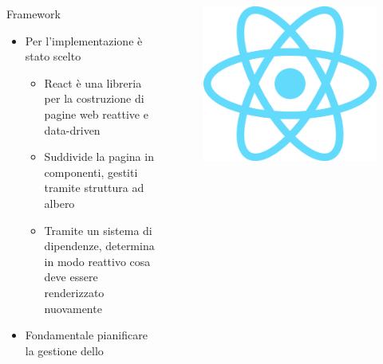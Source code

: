     \begin{frame}{\insertsectionhead}{\insertsubsectionhead}
      \begin{columns}
        \begin{column}{.8\textwidth}
          \begin{block}{Framework}
            \begin{itemize}
              \item
                Per l'implementazione è stato scelto 
                \begin{itemize}
                  \item React è una libreria per la costruzione di pagine web reattive e data-driven
                  \item Suddivide la pagina in componenti, gestiti tramite struttura ad albero
                  \item Tramite un sistema di dipendenze, determina in modo reattivo cosa deve essere renderizzato nuovamente
                \end{itemize}
              \item
                Fondamentale pianificare la gestione dello 
            \end{itemize}
          \end{block}
        \end{column}
        \begin{column}{.15\textwidth}
          \begin{figure}
            \includegraphics[width=\textwidth]{res/uml/react-logo.png}
          \end{figure}
        \end{column}
      \end{columns}
    \end{frame}


